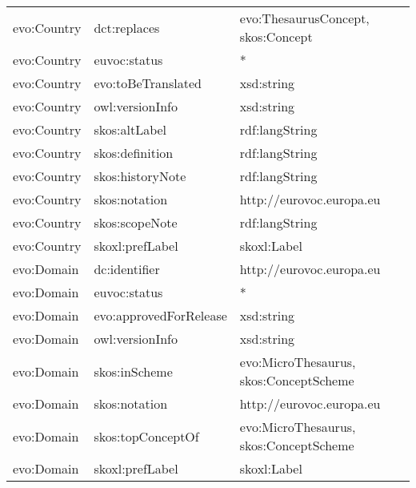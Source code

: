 \documentclass[10pt,a4paper,titlepage,final]{article}
\begin{document}
\begin{tabularx}{\textwidth}{llX}
                evo:Country &            dct:replaces &                 evo:ThesaurusConcept, skos:Concept \\
                evo:Country &            euvoc:status &                                                  * \\
                evo:Country &      evo:toBeTranslated &                                         xsd:string \\
                evo:Country &         owl:versionInfo &                                         xsd:string \\
                evo:Country &           skos:altLabel &                                     rdf:langString \\
                evo:Country &         skos:definition &                                     rdf:langString \\
                evo:Country &        skos:historyNote &                                     rdf:langString \\
                evo:Country &           skos:notation &                           http://eurovoc.europa.eu \\
                evo:Country &          skos:scopeNote &                                     rdf:langString \\
                evo:Country &         skoxl:prefLabel &                                        skoxl:Label \\
                 evo:Domain &           dc:identifier &                           http://eurovoc.europa.eu \\
                 evo:Domain &            euvoc:status &                                                  * \\
                 evo:Domain &  evo:approvedForRelease &                                         xsd:string \\
                 evo:Domain &         owl:versionInfo &                                         xsd:string \\
                 evo:Domain &           skos:inScheme &             evo:MicroThesaurus, skos:ConceptScheme \\
                 evo:Domain &           skos:notation &                           http://eurovoc.europa.eu \\
                 evo:Domain &       skos:topConceptOf &             evo:MicroThesaurus, skos:ConceptScheme \\
                 evo:Domain &         skoxl:prefLabel &                                        skoxl:Label \\

\end{tabularx}
\end{document}
